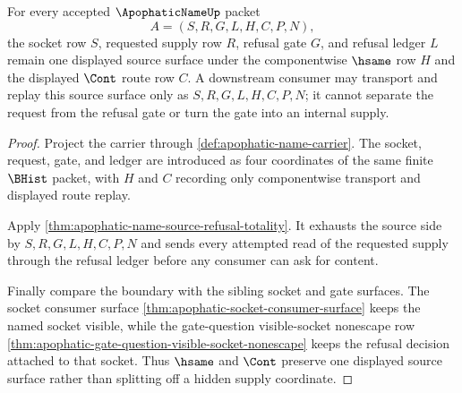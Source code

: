 \begin{theorem}
\label{thm:apophatic-name-gate-source-compatibility}
For every accepted $\ApophaticNameUp$ packet
$$
A=(S,R,G,L,H,C,P,N),
$$
the socket row $S$, requested supply row $R$, refusal gate $G$, and refusal ledger $L$ remain one displayed source surface under the componentwise $\hsame$ row $H$ and the displayed $\Cont$ route row $C$. A downstream consumer may transport and replay this source surface only as $S,R,G,L,H,C,P,N$; it cannot separate the request from the refusal gate or turn the gate into an internal supply.
\end{theorem}
\begin{proof}
Project the carrier through \autoref{def:apophatic-name-carrier}. The socket, request, gate, and ledger are introduced as four coordinates of the same finite $\BHist$ packet, with $H$ and $C$ recording only componentwise transport and displayed route replay.

Apply \autoref{thm:apophatic-name-source-refusal-totality}. It exhausts the source side by $S,R,G,L,H,C,P,N$ and sends every attempted read of the requested supply through the refusal ledger before any consumer can ask for content.

Finally compare the boundary with the sibling socket and gate surfaces. The socket consumer surface \autoref{thm:apophatic-socket-consumer-surface} keeps the named socket visible, while the gate-question visible-socket nonescape row \autoref{thm:apophatic-gate-question-visible-socket-nonescape} keeps the refusal decision attached to that socket. Thus $\hsame$ and $\Cont$ preserve one displayed source surface rather than splitting off a hidden supply coordinate.
\end{proof}

